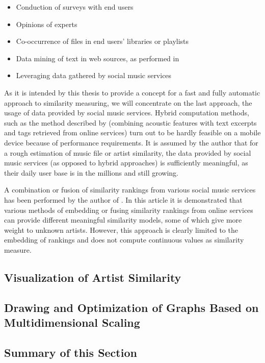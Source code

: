 \begin{itemize}
	\item Conduction of surveys with end users
	\item Opinions of experts
	\item Co-occurrence of files in end users' libraries or playlists
	\item Data mining of text in web sources, as performed in \cite{Whitman02inferringdescriptions}
	\item Leveraging data gathered by social music services
\end{itemize}

As it is intended by this thesis to provide a concept for a fast and fully automatic approach to similarity
measuring, we will concentrate on the last approach, the usage of data provided by social music services.
Hybrid computation methods, such as the method described by \cite{mcfee09_hesas} (combining acoustic 
features with text excerpts and tags retrieved from online services) turn out to be hardly feasible on a 
mobile device because of performance requirements. It is assumed by the author that for a rough estimation 
of music file or artist similarity, the data provided by social music services (as opposed to hybrid 
approaches) is sufficiently meaningful, as their daily user base is in the millions and still growing.

A combination or fusion of similarity rankings from various social music services has been performed by the
author of \cite{Marshall:2010}. In this article it is demonstrated that various methods of embedding or fusing
similarity rankings from online services can provide different meaningful similarity models, some of which
give more weight to unknown artists. However, this approach is clearly limited to the embedding of rankings 
and does not compute continuous values as similarity measure.

\subsection{Visualization of Artist Similarity}

\subsection{Drawing and Optimization of Graphs Based on Multidimensional Scaling}


\subsection{Summary of this Section}